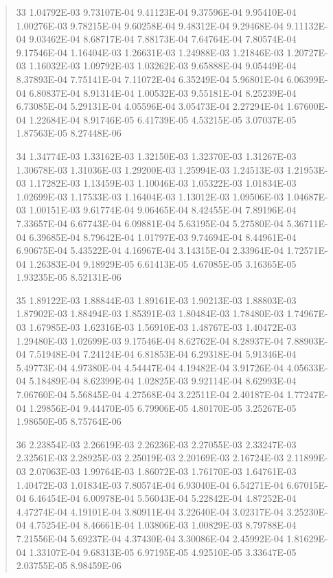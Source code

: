 \documentclass[letterpaper,10pt,english]{sphinxmanual}
\begin{document}
\begin{quote}
\begin{DUlineblock}{0em}
\item[] 33   1.04792E-03  9.73107E-04  9.41123E-04  9.37596E-04  9.95410E-04  1.00276E-03  9.78215E-04  9.60258E-04  9.48312E-04  9.29468E-04  9.11132E-04  9.03462E-04  8.68717E-04  7.88173E-04  7.64764E-04  7.80574E-04  9.17546E-04  1.16404E-03  1.26631E-03  1.24988E-03  1.21846E-03  1.20727E-03  1.16032E-03  1.09792E-03  1.03262E-03  9.65888E-04  9.05449E-04  8.37893E-04  7.75141E-04  7.11072E-04  6.35249E-04  5.96801E-04  6.06399E-04  6.80837E-04  8.91314E-04  1.00532E-03  9.55181E-04  8.25239E-04  6.73085E-04  5.29131E-04  4.05596E-04  3.05473E-04  2.27294E-04  1.67600E-04  1.22684E-04  8.91746E-05  6.41739E-05  4.53215E-05  3.07037E-05  1.87563E-05  8.27448E-06
\item[] 34   1.34774E-03  1.33162E-03  1.32150E-03  1.32370E-03  1.31267E-03  1.30678E-03  1.31036E-03  1.29200E-03  1.25994E-03  1.24513E-03  1.21953E-03  1.17282E-03  1.13459E-03  1.10046E-03  1.05322E-03  1.01834E-03  1.02699E-03  1.17533E-03  1.16404E-03  1.13012E-03  1.09506E-03  1.04687E-03  1.00151E-03  9.61774E-04  9.06465E-04  8.42455E-04  7.89196E-04  7.33657E-04  6.67743E-04  6.09881E-04  5.63195E-04  5.27580E-04  5.36711E-04  6.39685E-04  8.79642E-04  1.01797E-03  9.74694E-04  8.44961E-04  6.90675E-04  5.43522E-04  4.16967E-04  3.14315E-04  2.33964E-04  1.72571E-04  1.26383E-04  9.18929E-05  6.61413E-05  4.67085E-05  3.16365E-05  1.93235E-05  8.52131E-06
\item[] 35   1.89122E-03  1.88844E-03  1.89161E-03  1.90213E-03  1.88803E-03  1.87902E-03  1.88494E-03  1.85391E-03  1.80484E-03  1.78480E-03  1.74967E-03  1.67985E-03  1.62316E-03  1.56910E-03  1.48767E-03  1.40472E-03  1.29480E-03  1.02699E-03  9.17546E-04  8.62762E-04  8.28937E-04  7.88903E-04  7.51948E-04  7.24124E-04  6.81853E-04  6.29318E-04  5.91346E-04  5.49773E-04  4.97380E-04  4.54447E-04  4.19482E-04  3.91726E-04  4.05633E-04  5.18489E-04  8.62399E-04  1.02825E-03  9.92114E-04  8.62993E-04  7.06760E-04  5.56845E-04  4.27568E-04  3.22511E-04  2.40187E-04  1.77247E-04  1.29856E-04  9.44470E-05  6.79906E-05  4.80170E-05  3.25267E-05  1.98650E-05  8.75764E-06
\item[] 36   2.23854E-03  2.26619E-03  2.26236E-03  2.27055E-03  2.33247E-03  2.32561E-03  2.28925E-03  2.25019E-03  2.20169E-03  2.16724E-03  2.11899E-03  2.07063E-03  1.99764E-03  1.86072E-03  1.76170E-03  1.64761E-03  1.40472E-03  1.01834E-03  7.80574E-04  6.93040E-04  6.54271E-04  6.67015E-04  6.46454E-04  6.00978E-04  5.56043E-04  5.22842E-04  4.87252E-04  4.47274E-04  4.19101E-04  3.80911E-04  3.22640E-04  3.02317E-04  3.25230E-04  4.75254E-04  8.46661E-04  1.03806E-03  1.00829E-03  8.79788E-04  7.21556E-04  5.69237E-04  4.37430E-04  3.30086E-04  2.45992E-04  1.81629E-04  1.33107E-04  9.68313E-05  6.97195E-05  4.92510E-05  3.33647E-05  2.03755E-05  8.98459E-06

\end{DUlineblock}
\end{quote}
\end{document}
